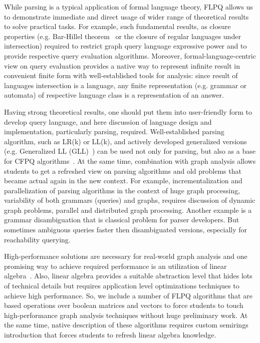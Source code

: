 \documentclass[sigconf]{acmart}
\begin{document}
While parsing is a typical application of formal language theory, FLPQ allows us to demonstrate immediate and direct usage of wider range of theoretical results to solve practical tasks.
For example, such fundamental results, as closure properties (e.g. Bar-Hillel theorem~\cite{BarHillel61} or the closure of regular languages under intersection) required to restrict graph query language expressive power and to provide respective query evaluation algorithms.
Moreover, formal-language-centric view on query evaluation provides a native way to represent infinite result in convenient finite form with well-established tools for analysis: since result of languages intersection is a language, any finite representation (e.g. grammar or automata) of respective language class is a representation of an answer.

Having strong theoretical results, one should put them into user-friendly form to develop query language, and here discussion of language design and implementation, particularly parsing, required.
Well-established parsing algorithm, such as LR(k) or LL(k), and actively developed generalized versions (e.g. Generalized LL (GLL)~\cite{10.1007/978-3-662-46663-6_5}) can be used not only for parsing, but also as a base for CFPQ algorithms~\cite{MEDEIROS201975,10.1007/978-3-319-91662-0_17, 10.1145/3166094.3166104}.
At the same time, combination with graph analysis allows students to get a refreshed view on parsing algorithms and old problems that became actual again in the new context.
For example, incrementalization and parallelization of parsing algorithms in the context of huge graph processing, variability of both grammars (queries) and graphs, requires discussion of dynamic graph problems, parallel and distributed graph processing.
Another example is a grammar disambiguation that is classical problem for parser developers.
But sometimes ambiguous queries faster then disambiguated versions, especially for reachability querying.

High-performance solutions are necessary for real-world graph analysis and one promising way to achieve required performance is an utilization of linear algebra~\cite{suitesparse}.
Also, linear algebra provides a suitable abstraction level that hides lots of technical details but requires application level optimizations techniques to achieve high performance.
So, we include a number of FLPQ algorithms that are based operations over boolean matrices and vectors to force students to touch high-performance graph analysis techniques without huge preliminary work.
At the same time, native description of these algorithms requires custom semirings introduction that forces students to refresh linear algebra knowledge. 
\end{document}
